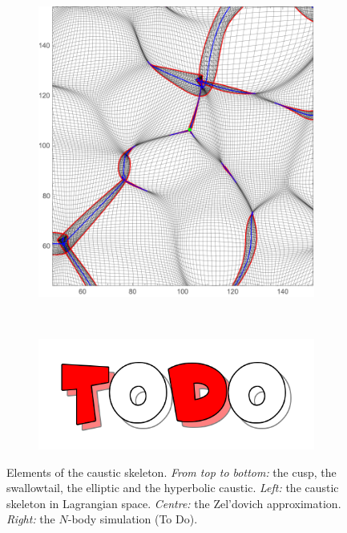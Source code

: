\documentclass[a4paper, 11pt]{article}
\begin{document}
\begin{figure}
\begin{subfigure}[b]{0.3\textwidth}
\includegraphics[width=\textwidth]{Hyperbolic_Z}
\end{subfigure}~
\begin{subfigure}[b]{0.3\textwidth}
\includegraphics[width=\textwidth]{Todo}
\end{subfigure}
\caption{Elements of the caustic skeleton. \textit{From top to bottom:} the cusp, the swallowtail, the elliptic and the hyperbolic caustic. \textit{Left:} the caustic skeleton in Lagrangian space. \textit{Centre:} the Zel'dovich approximation. \textit{Right:} the $N$-body simulation {\color{red}(To Do)}.}\label{fig:caustics_Examples_Big}
\end{figure}

\end{document}
